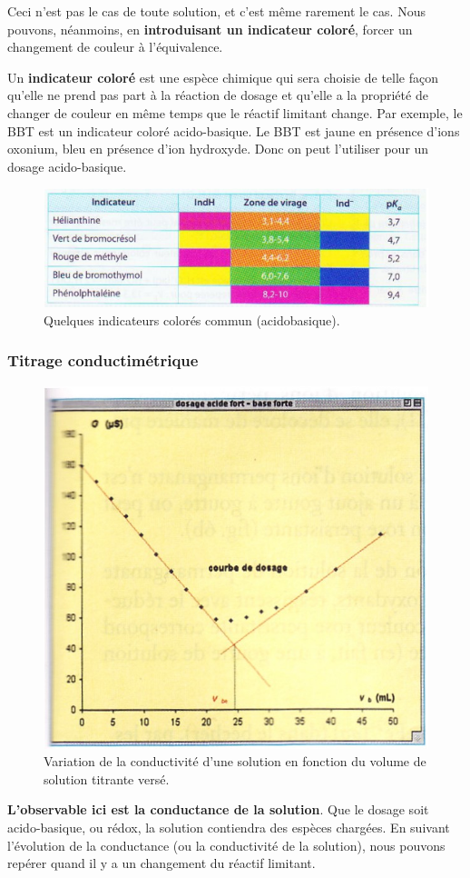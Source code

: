 \documentclass[11pt,a4paper]{article}
\begin{document}
Ceci n'est pas le cas de toute solution, et c'est même rarement le cas. Nous pouvons, néanmoins, en \textbf{introduisant un indicateur coloré}, forcer un changement de couleur à l'équivalence. 

Un \textbf{indicateur coloré} est une espèce chimique qui sera choisie de telle façon qu’elle ne prend pas part à la réaction de dosage et qu’elle a la propriété de changer de couleur en même temps que le réactif limitant change.  
Par exemple, le BBT est un indicateur coloré acido-basique.  Le BBT est jaune en présence d’ions oxonium, bleu en présence d’ion hydroxyde.  Donc on peut l’utiliser pour un dosage acido-basique.

\begin{figure}[h]
    \centering
    \includegraphics[width=0.8\linewidth]{imgs/c1/indicateurs.jpg}
    \caption{Quelques indicateurs colorés commun (acidobasique).}
\end{figure}
\newpage
\subsubsection{Titrage conductimétrique}
\begingroup
\setlength{\columnsep}{15pt}%
\begin{figure}
  \centering\includegraphics[width=\linewidth]{imgs/c1/courbeV.jpg}
  \caption{Variation de la conductivité d'une solution en fonction du volume de solution titrante versé.}
\end{figure}
\textbf{L’observable ici est la conductance de la solution}.   Que le dosage soit acido-basique, ou rédox, la solution contiendra des espèces chargées. En suivant l'évolution de la conductance (ou la conductivité de la solution), nous pouvons repérer quand il y a un changement du réactif limitant. 
\end{document}
